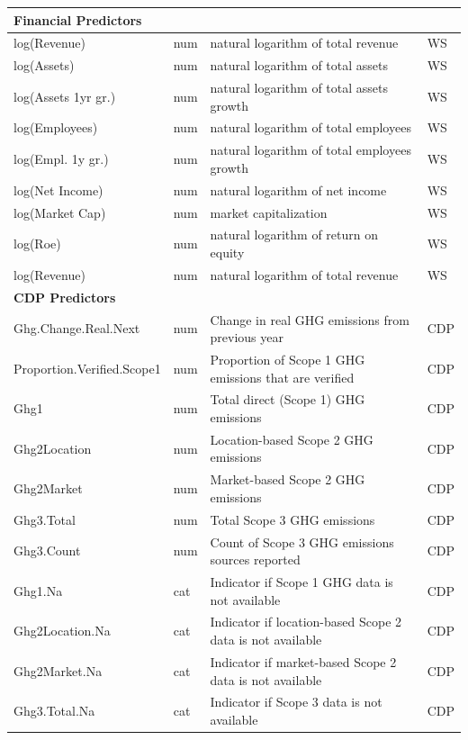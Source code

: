 \begin{longtable}{lp{1cm}p{6cm}p{1.1cm}}
    \midrule
    \multicolumn{4}{l}{\textbf{Financial Predictors}} \\
    \midrule
    log(Revenue) & num & natural logarithm of total revenue & WS \\
    log(Assets) & num & natural logarithm of total assets & WS \\
    log(Assets 1yr gr.) & num & natural logarithm of total assets growth & WS \\
    log(Employees) & num & natural logarithm of total employees & WS \\
    log(Empl. 1y gr.) & num & natural logarithm of total employees growth & WS \\
    log(Net Income) & num & natural logarithm of net income & WS \\
    log(Market Cap) & num & market capitalization & WS \\
    log(Roe) & num & natural logarithm of return on equity & WS \\
    log(Revenue) & num & natural logarithm of total revenue & WS \\
    \midrule
    \multicolumn{4}{l}{\textbf{CDP Predictors}} \\
    \midrule
    Ghg.Change.Real.Next & num & Change in real GHG emissions from previous year & CDP  \\
    Proportion.Verified.Scope1 & num & Proportion of Scope 1 GHG emissions that are verified & CDP  \\
    Ghg1 & num & Total direct (Scope 1) GHG emissions & CDP  \\
    Ghg2Location & num & Location-based Scope 2 GHG emissions & CDP  \\
    Ghg2Market & num & Market-based Scope 2 GHG emissions & CDP  \\
    Ghg3.Total & num & Total Scope 3 GHG emissions & CDP  \\
    Ghg3.Count & num & Count of Scope 3 GHG emissions sources reported & CDP  \\
    Ghg1.Na & cat & Indicator if Scope 1 GHG data is not available & CDP  \\
    Ghg2Location.Na & cat & Indicator if location-based Scope 2 data is not available & CDP  \\
    Ghg2Market.Na & cat & Indicator if market-based Scope 2 data is not available & CDP  \\
    Ghg3.Total.Na & cat & Indicator if Scope 3 data is not available & CDP  \\

\end{longtable}
